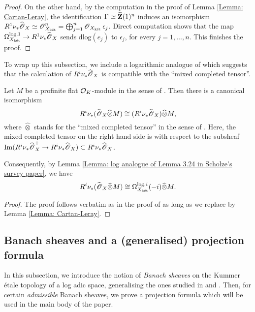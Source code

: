 \begin{proof}
 On the other hand, by the computation in the proof of Lemma \ref{Lemma: Cartan-Leray}, the identification $\Gamma\simeq \widehat{\operatorname{\mathbf{Z}}}(1)^n$ induces an isomorphism $R^1\nu_* \widehat{\operatorname{\mathscr{O}}}_X\simeq \operatorname{\mathscr{O}}_{X_{\operatorname{\textrm{k\'{e}t}}}}^n=\bigoplus_{j=1}^n \operatorname{\mathscr{O}}_{X_{\operatorname{\textrm{k\'{e}t}}}}\epsilon_j$. Direct computation shows that the map $\Omega^{\log,1}_{X_{\operatorname{\textrm{k\'{e}t}}}}\rightarrow R^1\nu_* \widehat{\operatorname{\mathscr{O}}}_X$ sends $\mathrm{dlog}(e_j)$ to $\epsilon_j$, for every $j=1, \ldots, n$. This finishes the proof.
\end{proof}

To wrap up this subsection, we include a logarithmic analogue of \cite[Proposition 6.8]{CHJ-2017} which suggests that the calculation of $R^i\nu_*\widehat{\operatorname{\mathscr{O}}}_X$ is compatible with the ``mixed completed tensor''. 

\begin{Proposition}\label{Proposition: compatibility with completed tensor}
Let $M$ be a profinite flat $\operatorname{\mathcal{O}}_K$-module in the sense of \cite[Definition 6.1]{CHJ-2017}. Then there is a canonical isomorphism
\[R^i\nu_*(\widehat{\operatorname{\mathscr{O}}}_{X}\widehat{\otimes}M)\cong (R^i\nu_*\widehat{\operatorname{\mathscr{O}}}_{X})\widehat{\otimes} M,\]
where $\widehat{\otimes}$ stands for the ``mixed completed tensor'' in the sense of \cite[Definition 6.6]{CHJ-2017}. Here, the mixed completed tensor on the right hand side is with respect to the subsheaf $\mathrm{Im}(R^i\nu_*\widehat{\operatorname{\mathscr{O}}}^+_X\rightarrow R^i\nu_*\widehat{\operatorname{\mathscr{O}}}_{X})\subset R^i\nu_*\widehat{\operatorname{\mathscr{O}}}_{X}$.

Consequently, by Lemma \ref{Lemma: log analogue of Lemma 3.24 in Scholze's survey paper}, we have
\[R^i\nu_*(\widehat{\operatorname{\mathscr{O}}}_{X}\widehat{\otimes}M)\cong \Omega^{\log, i}_{X_{\operatorname{\textrm{k\'{e}t}}}}(-i)\widehat{\otimes}M.\]
\end{Proposition}

\begin{proof}
The proof follows verbatim as in the proof of \cite[Proposition 6.8]{CHJ-2017} as long as we replace \cite[Lemma 6.11(1)(2)]{CHJ-2017} by Lemma \ref{Lemma: Cartan-Leray}.
\end{proof}


\subsection{Banach sheaves and a (generalised) projection formula}\label{subsection: generalised projective formula} 
In this subsection, we introduce the notion of \emph{Banach sheaves} on the Kummer \'etale topology of a log adic space, generalising the ones studied in \cite[\S A]{AIP-2015} and \cite[\S 2]{Boxer--Pilloni--higherColeman}. Then, for certain \emph{admissible} Banach sheaves, we prove a projection formula which will be used in the main body of the paper.

